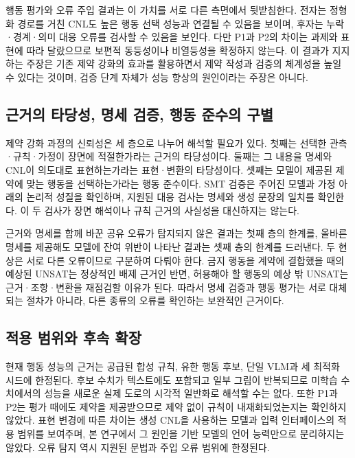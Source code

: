 \documentclass[10pt,a4paper,twocolumn]{article}\usepackage[margin=18mm]{geometry}\usepackage{fontspec,kotex}
\begin{document}
행동 평가와 오류 주입 결과는 이 가치를 서로 다른 측면에서 뒷받침한다. 전자는 정형화 경로를 거친 CNL도 높은 행동 선택 성능과 연결될 수 있음을 보이며, 후자는 누락·경계·의미 대응 오류를 검사할 수 있음을 보인다. 다만 P1과 P2의 차이는 과제와 표현에 따라 달랐으므로 보편적 동등성이나 비열등성을 확정하지 않는다. 이 결과가 지지하는 주장은 기존 제약 강화의 효과를 활용하면서 제약 작성과 검증의 체계성을 높일 수 있다는 것이며, 검증 단계 자체가 성능 향상의 원인이라는 주장은 아니다.\par

\subsection{근거의 타당성, 명세 검증, 행동 준수의 구별}

제약 강화 과정의 신뢰성은 세 층으로 나누어 해석할 필요가 있다. 첫째는 선택한 관측·규칙·가정이 장면에 적절한가라는 근거의 타당성이다. 둘째는 그 내용을 명세와 CNL이 의도대로 표현하는가라는 표현·변환의 타당성이다. 셋째는 모델이 제공된 제약에 맞는 행동을 선택하는가라는 행동 준수이다. SMT 검증은 주어진 모델과 가정 아래의 논리적 성질을 확인하며, 지원된 대응 검사는 명세와 생성 문장의 일치를 확인한다. 이 두 검사가 장면 해석이나 규칙 근거의 사실성을 대신하지는 않는다.\par

근거와 명세를 함께 바꾼 공유 오류가 탐지되지 않은 결과는 첫째 층의 한계를, 올바른 명세를 제공해도 모델에 잔여 위반이 나타난 결과는 셋째 층의 한계를 드러낸다. 두 현상은 서로 다른 오류이므로 구분하여 다뤄야 한다. 금지 행동을 계약에 결합했을 때의 예상된 UNSAT는 정상적인 배제 근거인 반면, 허용해야 할 행동의 예상 밖 UNSAT는 근거·조항·변환을 재점검할 이유가 된다. 따라서 명세 검증과 행동 평가는 서로 대체되는 절차가 아니라, 다른 종류의 오류를 확인하는 보완적인 근거이다.\par

\subsection{적용 범위와 후속 확장}

현재 행동 성능의 근거는 공급된 합성 규칙, 유한 행동 후보, 단일 VLM과 세 최적화 시드에 한정된다. 후보 수치가 텍스트에도 포함되고 일부 그림이 반복되므로 미학습 수치에서의 성능을 새로운 실제 도로의 시각적 일반화로 해석할 수는 없다. 또한 P1과 P2는 평가 때에도 제약을 제공받으므로 제약 없이 규칙이 내재화되었는지는 확인하지 않았다. 표현 변경에 따른 차이는 생성 CNL을 사용하는 모델과 입력 인터페이스의 적용 범위를 보여주며, 본 연구에서 그 원인을 기반 모델의 언어 능력만으로 분리하지는 않았다. 오류 탐지 역시 지원된 문법과 주입 오류 범위에 한정된다.\par
\end{document}
